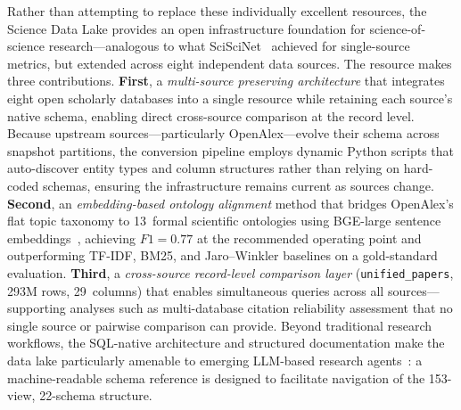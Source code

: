 Rather than attempting to replace these individually excellent resources, the
Science Data Lake provides an open infrastructure foundation for
science-of-science research---analogous to what
SciSciNet~\cite{lin2023sciscinet} achieved for single-source metrics, but
extended across eight independent data sources. The resource makes three
contributions. \textbf{First}, a \emph{multi-source preserving architecture}
that integrates eight open scholarly databases into a single resource while
retaining each source's native schema, enabling direct cross-source comparison at
the record level. Because upstream sources---particularly OpenAlex---evolve their
schema across snapshot partitions, the conversion pipeline employs dynamic Python
scripts that auto-discover entity types and column structures rather than relying
on hard-coded schemas, ensuring the infrastructure remains current as sources
change. \textbf{Second}, an \emph{embedding-based ontology alignment}
method that bridges OpenAlex's flat topic taxonomy to 13~formal scientific
ontologies using BGE-large sentence embeddings~\cite{xiao2024bge}, achieving
$F1 = 0.77$ at the recommended operating point and outperforming TF-IDF,
BM25, and Jaro--Winkler baselines on a gold-standard evaluation. \textbf{Third}, a
\emph{cross-source record-level comparison layer} (\texttt{unified\_papers},
293M rows, 29~columns) that enables simultaneous queries across all
sources---supporting analyses such as multi-database citation reliability
assessment that no single source or pairwise comparison can provide.
Beyond traditional research workflows, the SQL-native architecture and
structured documentation make the data lake particularly amenable to
emerging LLM-based research agents~\cite{wang2023aiforscience}: a
machine-readable schema reference is designed to facilitate navigation of
the 153-view, 22-schema structure.
